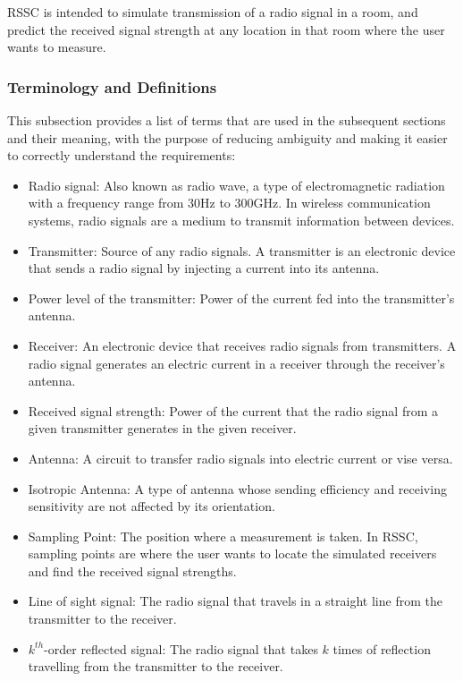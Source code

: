 \documentclass[12pt]{article}
\begin{document}
RSSC is intended to simulate transmission of a radio signal in a room, and 
predict the received signal strength at any location in that room where the 
user wants to measure.

\subsubsection{Terminology and  Definitions}
This subsection provides a list of terms that are used in the subsequent
sections and their meaning, with the purpose of reducing ambiguity and making it
easier to correctly understand the requirements:

\begin{itemize}

\item Radio signal: Also known as radio wave, a type of electromagnetic radiation
with a frequency range from 30Hz to 300GHz. In wireless communication systems, 
radio signals are a medium to transmit information between devices.
\item Transmitter: Source of any radio signals. A transmitter is an electronic 
device that sends a radio signal by injecting a current into its antenna. 
\item Power level of the transmitter: Power of the current fed into the transmitter's antenna.
\item Receiver: An electronic device that receives radio signals from transmitters.
A radio signal generates an electric current in a receiver through the receiver's 
antenna.
\item Received signal strength: Power of the current that the radio signal from a 
given transmitter generates in the given receiver.
\item Antenna: A circuit to transfer radio signals into electric current or vise 
versa.
\item Isotropic Antenna: A type of antenna whose sending efficiency and receiving sensitivity are not affected by its orientation.  
\item Sampling Point: The position where a measurement is taken. In RSSC,
sampling points are where the user wants to locate the simulated receivers and 
find the received signal strengths.
\item Line of sight signal: The radio signal that travels in a straight line 
from the transmitter to the receiver.
\item $k^{th}$-order reflected signal: The radio signal that takes $k$ times of reflection travelling from the transmitter to the receiver.
\end{itemize}
\end{document}
